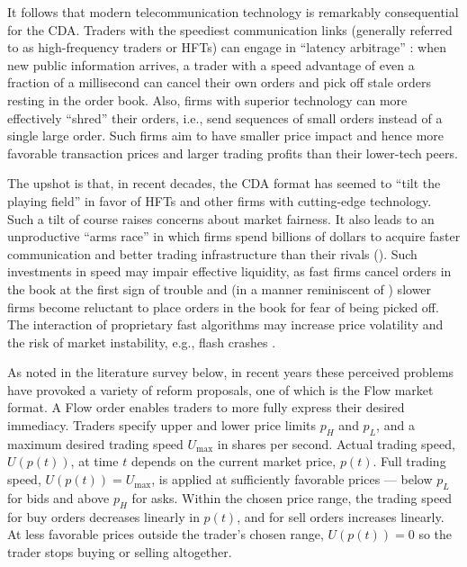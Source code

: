 \documentclass[12pt]{article}
\begin{document}
It follows that modern telecommunication technology is remarkably consequential for the CDA. Traders   
with the speediest communication links (generally referred to as  high-frequency traders or HFTs) can engage in ``latency arbitrage'' \citep{Budish2015,AquilinaBudishOneill2022}: 
when new public information arrives,
a trader with a speed advantage of even a fraction of a millisecond can cancel their own orders and pick off stale orders resting in the order book. 
Also, firms with superior technology can more effectively ``shred'' their orders, i.e., send sequences of small orders instead of a single large order.
Such firms aim to have smaller price impact and hence more favorable transaction prices and larger trading profits than their lower-tech peers. 

The upshot is that, in recent decades, the CDA format has 
seemed to ``tilt the playing field'' in favor of HFTs and other firms with cutting-edge technology. 
Such a tilt of course raises concerns about market fairness. 
It also
leads to an unproductive ``arms race'' in which firms spend billions of dollars to acquire faster communication and better trading infrastructure than their rivals (\cite{Budish2015}).
Such investments in speed may impair  effective liquidity, as fast firms cancel orders in the book at the first sign of trouble and 
(in a manner reminiscent of \citealp{Easly2012}) slower firms become reluctant to place orders in the book for fear of being picked off.
The interaction of proprietary fast algorithms may increase price volatility and the risk of market instability, e.g., flash crashes \citep{aldrich2017flash}.

As noted in the literature survey below, in recent years these perceived problems have provoked a variety of reform proposals, one of which is the Flow market format. 
A Flow order
enables traders to more fully express their desired immediacy. 
Traders specify upper and lower price limits $p_H$ and $p_L$, and a maximum desired trading speed $U_{\max}$ in shares per second. 
Actual 
trading speed, \(U(p(t))\), at time $t$ depends on the current market price, \(p(t)\). Full trading speed,
$U(p(t))=U_{\max}$, is applied at sufficiently favorable prices --- below \(p_L\) for bids and above \(p_H\) for asks. Within the chosen price range, the trading speed for buy orders decreases linearly in $p(t)$, and for sell orders increases linearly.
At less favorable prices outside the trader's chosen range,
$U(p(t))=0$ so the trader stops buying or selling altogether. 
\end{document}
